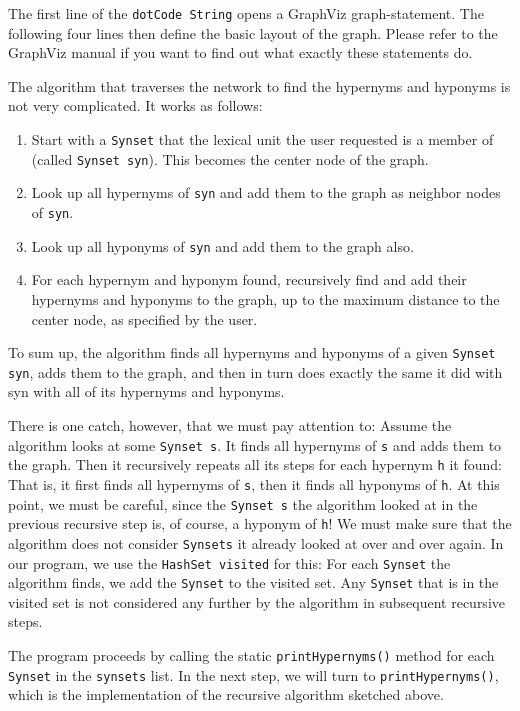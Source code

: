 \documentclass[12pt,a4paper,english,utf8]{report}
\begin{document}
The first line of the \texttt{dotCode String} opens a GraphViz graph-statement. The following four lines then define the basic layout of the graph. Please refer to the GraphViz manual if you want to find out what exactly these statements do.

The algorithm that traverses the network to find the hypernyms and hyponyms is not very complicated. It works as follows:

\begin{enumerate}
	\item Start with a \texttt{Synset} that the lexical unit the user requested is a member of (called \texttt{Synset syn}). This becomes the center node of the graph.
	\item Look up all hypernyms of \texttt{syn} and add them to the graph as neighbor nodes of \texttt{syn}.
	\item Look up all hyponyms of \texttt{syn} and add them to the graph also.
	\item For each hypernym and hyponym found, recursively find and add their hypernyms and hyponyms to the graph, up to the maximum distance to the center node, as specified by the user.
\end{enumerate}

To sum up, the algorithm finds all hypernyms and hyponyms of a given \texttt{Synset syn}, adds them to the graph, and then in turn does exactly the same it did with syn with all of its hypernyms and hyponyms.

There is one catch, however, that we must pay attention to: Assume the algorithm looks at some \texttt{Synset s}. It finds all hypernyms of \texttt{s} and adds them to the graph. Then it recursively repeats all its steps for each hypernym \texttt{h} it found: That is, it first finds all hypernyms of \texttt{s}, then it finds all hyponyms of \texttt{h}. At this point, we must be careful, since the \texttt{Synset s} the algorithm looked at in the previous recursive step is, of course, a hyponym of \texttt{h}! We must make sure that the algorithm does not consider \texttt{Synsets} it already looked at over and over again. In our program, we use the \texttt{HashSet visited} for this: For each \texttt{Synset} the algorithm finds, we add the \texttt{Synset} to the visited set. Any \texttt{Synset} that is in the visited set is not considered any further by the algorithm in subsequent recursive steps.

The program proceeds by calling the static \texttt{printHypernyms()} method for each \texttt{Synset} in the \texttt{synsets} list. In the next step, we will turn to \texttt{printHypernyms()}, which is the implementation of the recursive algorithm sketched above.
\end{document}
